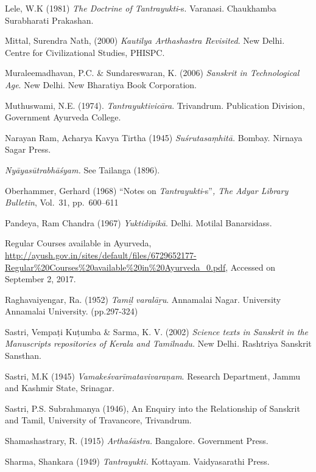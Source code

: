 \begin{thebibliography}{99}
  Lele, W.K (1981) \textit{The Doctrine of Tantrayukti}-s. Varanasi. Chaukhamba Surabharati Prakashan.

  Mittal, Surendra Nath, (2000) \textit{Kautilya Arthashastra Revisited}. New Delhi. Centre for Civilizational Studies, PHISPC.

  Muraleemadhavan, P.C. \& Sundareswaran, K. (2006) \textit{Sanskrit in Technological Age}. New Delhi. New Bharatiya Book Corporation.

  Muthuswami, N.E. (1974). \textit{Tantrayuktivicāra}. Trivandrum. Publication Division, Government Ayurveda College.

  Narayan Ram, Acharya Kavya Tirtha (1945) \textit{Suśrutasaṃhitā.} Bombay. Nirnaya Sagar Press.

  \textit{Nyāyasūtrabhāśyam.} See Tailanga (1896).

  Oberhammer, Gerhard (1968) “Notes on \textit{Tantrayukti}-s”\textit{, The Adyar Library Bulletin}, Vol.~31, pp.~600--611

  Pandeya, Ram Chandra (1967) \textit{Yuktidīpikā}. Delhi. Motilal Banarsidass.

  Regular Courses available in Ayurveda, \url{http://ayush.gov.in/sites/default/files/6729652177-Regular%20Courses%20available%20in%20Ayurveda_0.pdf}, Accessed on September 2, 2017.

  Raghavaiyengar, Ra. (1952) \textit{Tamiḻ varalāṟu}. Annamalai Nagar. University Annamalai University. (pp.297-324)

  Sastri, Vempaṭi Kuṭumba \& Sarma, K. V. (2002) \textit{Science texts in Sanskrit in the Manuscripts repositories of Kerala and Tamilnadu. } New Delhi\textit{.} Rashtriya Sanskrit Sansthan.

  Sastri, M.K (1945) \textit{Vamakeśvarīmatavivaraṇam}. Research Department, Jammu and Kashmir State, Srinagar.

  Sastri, P.S. Subrahmanya (1946), An Enquiry into the Relationship of Sanskrit and Tamil, University of Travancore, Trivandrum.

  Shamashastrary, R. (1915) \textit{Arthaśāstra. } Bangalore\textit{.} Government Press.

  Sharma, Shankara (1949) \textit{Tantrayukti.} Kottayam. Vaidyasarathi Press.


\end{thebibliography}
